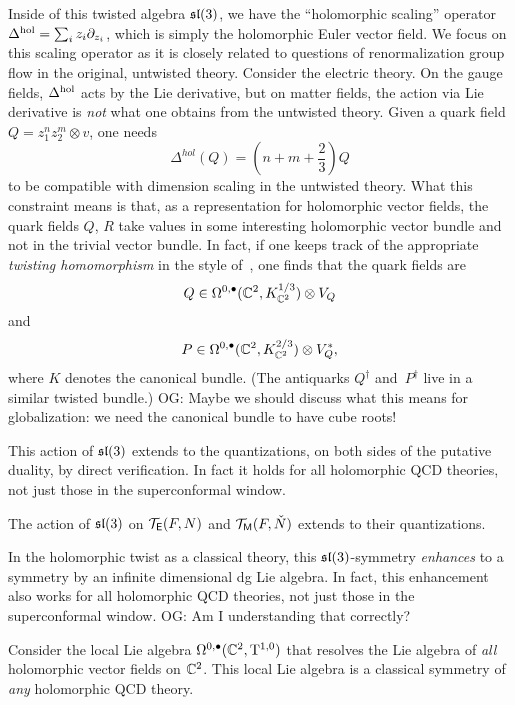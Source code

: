 \documentclass[11pt]{amsart}
\def\owen#1{{\textcolor{violet!65!black}{OG: {#1}}}}
\begin{document}
Inside of this twisted algebra $\sl(3)$, we have the ``holomorphic scaling'' operator $\Delta^{\rm hol} = \sum_i z_i \partial_{z_i}$, which is simply the holomorphic Euler vector field.  
We focus on this scaling operator as it is closely related to questions of renormalization group flow in the original, untwisted theory.
Consider the electric theory. 
On the gauge fields, $\Delta^{\rm hol}$ acts by the Lie derivative,
but on matter fields, the action via Lie derivative is {\em not} what one obtains from the untwisted theory.
Given a quark field $Q = z_1^n z_2^m \otimes v$, 
one needs
\[
\Delta^{hol}(Q) = \left(n + m + \frac23\right) Q 
\]
to be compatible with dimension scaling in the untwisted theory.
What this constraint means is that, as a representation for holomorphic vector fields, 
the quark fields $Q$, $R$ take values in some interesting holomorphic vector bundle and not in the trivial vector bundle.  
In fact, if one keeps track of the appropriate {\em twisting homomorphism} in the style of~\cite{WittenTwist}, 
one finds that the quark fields are
\[
Q \in \Omega^{0,\bu}(\CC^2 , K_{\CC^2}^{1/3}) \otimes V_Q 
\] 
and
\[ P \in \Omega^{0,\bu}(\CC^2 , K_{\CC^2}^{2/3}) \otimes V_Q^*,
\]
where $K$ denotes the canonical bundle.
(The antiquarks ${Q}^\dag$ and~${P}^\dag$ live in a similar twisted bundle.) 
\owen{Maybe we should discuss what this means for globalization: we need the canonical bundle to have cube roots!}

This action of $\sl(3)$ extends to the quantizations, on both sides of the putative duality, by direct verification.
In fact it holds for all holomorphic QCD theories, not just those in the superconformal window.

\begin{lem}
The action of $\sl(3)$ on $\cT_{\sfE}(F,N)$ and $\cT_{\sfM}(F,\check{N})$ extends to their quantizations.
\end{lem}

In the holomorphic twist as a classical theory,
this $\sl(3)$-symmetry {\em enhances} to a symmetry by an infinite dimensional dg Lie algebra.
In fact, this enhancement also works for all holomorphic QCD theories, not just those in the superconformal window.
\owen{Am I understanding that correctly?}

\begin{thm} 
\label{thm:swsuco}
Consider the local Lie algebra $\Omega^{0,\bu}(\CC^2, \T^{1,0})$ that resolves the Lie algebra of {\em all} holomorphic vector fields on $\CC^2$. 
This local Lie algebra is a classical symmetry of {\em any} holomorphic QCD theory. 
\end{thm}
\end{document}
